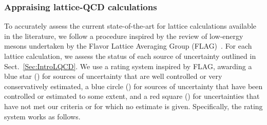 \subsubsection{Appraising lattice-QCD calculations}
\label{subsubsec:BClQCD}

To accurately assess the current state-of-the-art for lattice calculations
available in the literature, we follow a procedure inspired by the review of 
low-energy mesons undertaken by the Flavor Lattice Averaging Group 
(FLAG)~\cite{Aoki:2016frl}. 
%
For each lattice calculation, we assess the status of each source of 
uncertainty outlined in Sect.~\ref{Sec:IntroLQCD}. 
%
We use a rating system inspired by FLAG, awarding a blue star (\bstar) for 
sources of uncertainty that are well controlled or very conservatively 
estimated, a blue circle (\bcirc) for sources of uncertainty that have been 
controlled or estimated to some extent, and a red square (\rsquare) for 
uncertainties that have not met our criteria or for which no estimate is given.
%
Specifically, the rating system works as follows.

